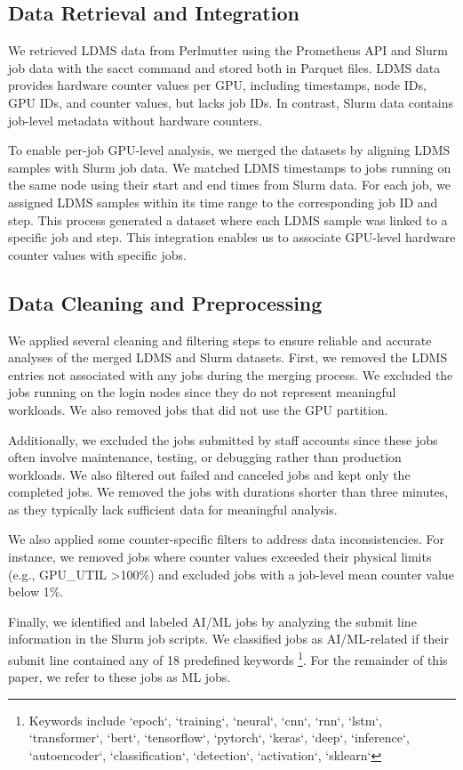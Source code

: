 \subsection{Data Retrieval and Integration}

We retrieved LDMS data from Perlmutter using the Prometheus API and
Slurm job data with the sacct command and stored both in Parquet files.
LDMS data provides hardware counter values per GPU, including timestamps,
node IDs, GPU IDs, and counter values, but lacks job IDs. In contrast,
Slurm data contains job-level metadata without hardware counters.

To enable per-job GPU-level analysis, we merged the datasets by aligning
LDMS samples with Slurm job data. We matched LDMS timestamps to jobs running
on the same node using their start and end times from Slurm data. For each job,
we assigned LDMS samples within its time range to the corresponding job ID
and step. This process generated a dataset where each LDMS sample was linked
to a specific job and step. This integration enables us to associate
GPU-level hardware counter values with specific jobs.

\subsection{Data Cleaning and Preprocessing}

We applied several cleaning and filtering steps to ensure reliable and
accurate analyses of the merged LDMS and Slurm datasets. First, we removed the
LDMS entries not associated with any jobs during the merging process.  We excluded
the jobs running on the login nodes since they do not represent meaningful
workloads. We also removed jobs that did not use the GPU partition.

Additionally, we excluded the jobs submitted by staff accounts since these jobs
often involve maintenance, testing, or debugging rather than production
workloads. We also filtered out failed and canceled
jobs and kept only the completed jobs. We removed the jobs with durations
shorter than three minutes, as they typically lack sufficient data for
meaningful analysis.

We also applied some counter-specific filters to address data inconsistencies.
For instance, we removed jobs where counter values exceeded their
physical limits (e.g., GPU\_UTIL \textgreater 100\%) and excluded jobs with
a job-level mean counter value below 1\%.

Finally, we identified and labeled AI/ML jobs by analyzing the submit line
information in the Slurm job scripts. We classified jobs as AI/ML-related if
their submit line contained any of 18 predefined keywords \footnote{Keywords
  include `epoch`, `training`, `neural`, `cnn`, `rnn`, `lstm`, `transformer`,
  `bert`, `tensorflow`, `pytorch`, `keras`, `deep`, `inference`, `autoencoder`,
  `classification`, `detection`, `activation`, `sklearn`}.
For the remainder of this paper, we refer to these jobs as ML jobs.
